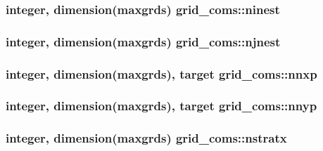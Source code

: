 \subsubsection[{\texorpdfstring{ninest}{ninest}}]{\setlength{\rightskip}{0pt plus 5cm}integer, dimension(maxgrds) grid\+\_\+coms\+::ninest}\hypertarget{namespacegrid__coms_aed0f3b9fcb2b4db297ffcea4d0bb1450}{}\label{namespacegrid__coms_aed0f3b9fcb2b4db297ffcea4d0bb1450}
\subsubsection[{\texorpdfstring{njnest}{njnest}}]{\setlength{\rightskip}{0pt plus 5cm}integer, dimension(maxgrds) grid\+\_\+coms\+::njnest}\hypertarget{namespacegrid__coms_a98e39448e926de9a2fa2de1ad700e7ae}{}\label{namespacegrid__coms_a98e39448e926de9a2fa2de1ad700e7ae}
\subsubsection[{\texorpdfstring{nnxp}{nnxp}}]{\setlength{\rightskip}{0pt plus 5cm}integer, dimension(maxgrds), target grid\+\_\+coms\+::nnxp}\hypertarget{namespacegrid__coms_a94ce46153415e535023e58d322bcaa98}{}\label{namespacegrid__coms_a94ce46153415e535023e58d322bcaa98}
\subsubsection[{\texorpdfstring{nnyp}{nnyp}}]{\setlength{\rightskip}{0pt plus 5cm}integer, dimension(maxgrds), target grid\+\_\+coms\+::nnyp}\hypertarget{namespacegrid__coms_a5776874c241f87f4651671b401170756}{}\label{namespacegrid__coms_a5776874c241f87f4651671b401170756}
\subsubsection[{\texorpdfstring{nstratx}{nstratx}}]{\setlength{\rightskip}{0pt plus 5cm}integer, dimension(maxgrds) grid\+\_\+coms\+::nstratx}\hypertarget{namespacegrid__coms_a319d9e19581f63cae8b605b8c8a6ab85}{}\label{namespacegrid__coms_a319d9e19581f63cae8b605b8c8a6ab85}

